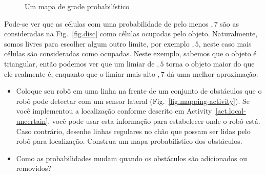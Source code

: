 \begin{figure}
\begin{center}
\caption{Um mapa de grade probabilístico}\label{fig.prob-grid}
\end{center}
\end{figure}

Pode-se ver que as células com uma probabilidade de pelo menos $,7$ são as consideradas na Fig.~\ref{fig.disc} como células ocupadas pelo objeto. Naturalmente, somos livres para escolher algum outro limite, por exemplo $,5$, neste caso mais células são consideradas como ocupadas. Neste exemplo, sabemos que o objeto é triangular, então podemos ver que um limiar de $,5$ torna o objeto maior do que ele realmente é, enquanto que o limiar mais alto $,7$ dá uma melhor aproximação.

\begin{framed}
\begin{itemize}
\item Coloque seu robô em uma linha na frente de um conjunto de obstáculos que o robô pode detectar com um sensor lateral (Fig.~\ref{fig.mapping-activity}). Se você implementou a localização conforme descrito em Activity~\ref{act.local-uncertain}, você pode usar esta informação para estabelecer onde o robô está. Caso contrário, desenhe linhas regulares no chão que possam ser lidas pelo robô para localização. Construa um mapa probabilístico dos obstáculos.
\item Como as probabilidades mudam quando os obstáculos são adicionados ou removidos?
\end{itemize}
\end{framed}

